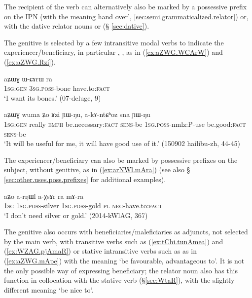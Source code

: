 The recipient of the verb   can alternatively also be marked by a possessive prefix on the IPN  (with the meaning  hand over', \ref{sec:semi.grammaticalized.relator}) or, with the dative relator nouns  or  (§ \ref{sec:dative}).

The genitive is selected by a few intransitive modal verbs to indicate the experiencer/beneficiary, in particular  , , as in (\ref{ex:aZWG.WCArW}) and (\ref{ex:aZWG.Rzi}).

\begin{exe}
\ex \label{ex:aZWG.WCArW}
 \gll aʑɯɣ ɯ-ɕɤrɯ ra \\
 \textsc{1sg:gen} \textsc{3sg.poss}-bone have.to:\textsc{fact} \\
\glt `I want its bones.' (07-deluge, 9)
\end{exe}

\begin{exe}
\ex \label{ex:aZWG.Rzi}
 \gll aʑɯɣ wuma ʑo ʁzi ɲɯ-ŋu, a-kɤ-ntɕʰoz sna ɲɯ-ŋu \\
  \textsc{1sg:gen} really \textsc{emph} be.necessary:\textsc{fact} \textsc{sens}-be \textsc{1sg}.\textsc{poss}-nmlz:P-use be.good:\textsc{fact}  \textsc{sens}-be \\
  \glt `It will be useful for me, it will have good use of it.'  (150902 hailibu-zh, 44-45)
\end{exe}

The experiencer/beneficiary can also be marked by possessive prefixes on the subject, without genitive, as in 
(\ref{ex:arNWl.mAra}) (see also § \ref{sec:other.uses.poss.prefixes} for additional examples).

\begin{exe}
\ex \label{ex:arNWl.mAra}
 \gll aʑo a-rŋɯl a-χsɤr ra mɤ-ra \\
 \textsc{1sg} \textsc{1sg}.\textsc{poss}-silver \textsc{1sg}.\textsc{poss}-gold \textsc{pl} \textsc{neg}-have.to:\textsc{fact} \\
 \glt `I don't  need silver or gold.' (2014-kWlAG, 367)
\end{exe}

The genitive also occurs with beneficiaries/maleficiaries as adjuncts, not selected by the main verb, with transitive verbs such as  (\ref{ex:tChi.tunAmea}) and  (\ref{ex:WZAG.pjAmaR}) or stative intransitive verbs such as  as in (\ref{ex:aZWG.mApe}) with the meaning `be favourable, advantageous to'.  It is not the only possible way of expressing beneficiary; the relator noun  also has this function in collocation with the stative verb  (§\ref{sec:WtaR}), with the slightly different meaning `be nice to'.

